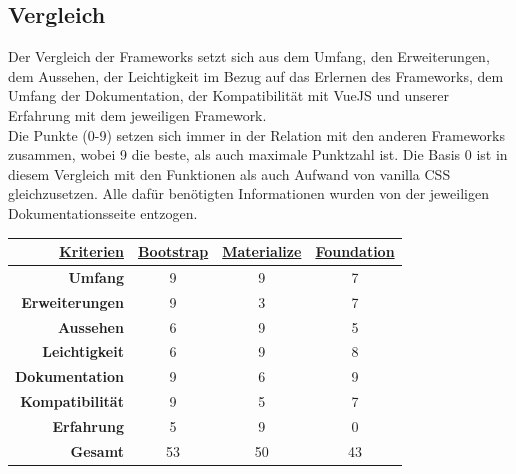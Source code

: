 	\subsection{Vergleich}
	Der Vergleich der Frameworks setzt sich aus dem Umfang, den Erweiterungen, dem Aussehen, der Leichtigkeit im Bezug auf das Erlernen des Frameworks, dem Umfang der Dokumentation, der Kompatibilität mit VueJS und unserer Erfahrung mit dem jeweiligen Framework.\\
	Die Punkte (0-9) setzen sich immer in der Relation mit den anderen Frameworks zusammen, wobei 9 die beste, als auch maximale Punktzahl ist. Die Basis 0 ist in diesem Vergleich mit den Funktionen als auch Aufwand von vanilla CSS gleichzusetzen. Alle dafür benötigten Informationen wurden von der jeweiligen Dokumentationsseite entzogen.
	\begin{center}
		\begin{table}
			\centering
		\begin{tabular}{rccc}
			\hline
			\multicolumn{1}{|r|}{{\underline{\textbf{Kriterien}}}} & \multicolumn{1}{c|}{{\underline{\textbf{Bootstrap}}}} & \multicolumn{1}{c|}{{ \underline{\textbf{Materialize}}}} & \multicolumn{1}{c|}{{\underline{\textbf{Foundation}}}} \\ \hline
			\multicolumn{1}{|r|}{\textbf{Umfang}}          & \multicolumn{1}{c|}{9}                        & \multicolumn{1}{c|}{9}                          & \multicolumn{1}{c|}{7}                         \\ \hline
			\multicolumn{1}{|r|}{\textbf{Erweiterungen}}   & \multicolumn{1}{c|}{9}                        & \multicolumn{1}{c|}{3}                          & \multicolumn{1}{c|}{7}                         \\ \hline
			\multicolumn{1}{|r|}{\textbf{Aussehen}}        & \multicolumn{1}{c|}{6}                        & \multicolumn{1}{c|}{9}                          & \multicolumn{1}{c|}{5}                         \\ \hline
			\multicolumn{1}{|r|}{\textbf{Leichtigkeit}}    & \multicolumn{1}{c|}{6}                        & \multicolumn{1}{c|}{9}                          & \multicolumn{1}{c|}{8}                         \\ \hline
			\multicolumn{1}{|r|}{\textbf{Dokumentation}}   & \multicolumn{1}{c|}{9}                        & \multicolumn{1}{c|}{6}                          & \multicolumn{1}{c|}{9}                         \\ \hline
			\multicolumn{1}{|r|}{\textbf{Kompatibilität}}  & \multicolumn{1}{c|}{9}                        & \multicolumn{1}{c|}{5}                          & \multicolumn{1}{c|}{7}                         \\ \hline
			\multicolumn{1}{|r|}{\textbf{Erfahrung}}       & \multicolumn{1}{c|}{5}                        & \multicolumn{1}{c|}{9}                          & \multicolumn{1}{c|}{0}                         \\ \hline
			\textbf{Gesamt}                                & 53                                            & 50                                              & 43                                            
		\end{tabular}
	\end{table}
	\end{center}
